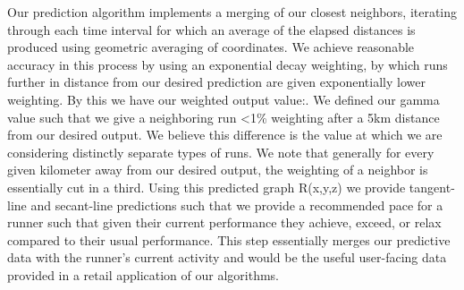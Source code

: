 \documentclass[twoside]{article}
\begin{document}
\begin{multicols}{2}
	Our prediction algorithm implements a merging of our closest neighbors, iterating through each time interval for which an average of the elapsed distances is produced using geometric averaging of coordinates.  We achieve reasonable accuracy in this process by using an exponential decay weighting, by which runs further in distance from our desired prediction are given exponentially lower weighting.  By this we have our weighted output value:. We defined our gamma value such that we give a neighboring run <1\% weighting after a 5km distance from our desired output.  We believe this difference is the value at which we are considering distinctly separate types of runs.  We note that generally for every given kilometer away from our desired output, the weighting of a neighbor is essentially cut in a third.
	Using this predicted graph R(x,y,z) we provide tangent-line and secant-line predictions such that we provide a recommended pace for a runner such that given their current performance they achieve, exceed, or relax compared to their usual performance.  This step essentially merges our predictive data with the runner’s current activity and would be the useful user-facing data provided in a retail application of our algorithms.


\end{multicols}
\end{document}
